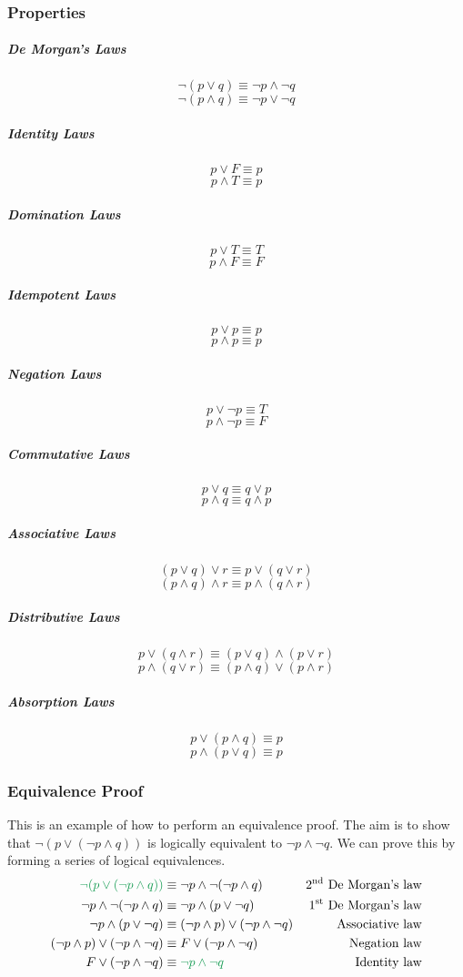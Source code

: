 \documentclass[a4paper, 10pt]{article}
\begin{document}
\subsubsection{Properties}
\begin{multicols}{2}
    \subparagraph{De Morgan's Laws}
    \[ \neg(p\lor q) \equiv \neg p \land \neg q \]
    \[ \neg(p\land q) \equiv \neg p \lor \neg q \]

    \subparagraph{Identity Laws}
    \[ p \lor F \equiv p \]
    \[ p \land T \equiv p \]

    \subparagraph{Domination Laws}
    \[ p \lor T \equiv T \]
    \[ p \land F \equiv F \]

    \subparagraph{Idempotent Laws}
    \[ p \lor p \equiv p\]
    \[p \land p \equiv p\]

    \subparagraph{Negation Laws}
    \[ p \lor \neg p \equiv T \]
    \[ p \land \neg p \equiv F \]

    \subparagraph{Commutative Laws}
    \[ p \lor q \equiv q \lor p \]
    \[ p \land q \equiv q \land p\]

    \subparagraph{Associative Laws}
    \[ (p \lor q)\lor r \equiv p\lor(q\lor r) \]
    \[ (p \land q)\land r \equiv p\land(q\land r) \]

    \subparagraph{Distributive Laws}
    \[ p\lor (q \land r) \equiv (p\lor q) \land (p\lor r) \]
    \[ p\land (q\lor r) \equiv (p\land q)\lor(p\land r) \]

    \subparagraph{Absorption Laws}
    \[ p \lor (p\land q) \equiv p \]
    \[ p \land (p\lor q) \equiv p \]
\end{multicols}

\subsubsection{Equivalence Proof}
This is an example of how to perform an equivalence proof. The aim is to show that \( \neg(p\lor (\neg p \land q)) \) is logically equivalent to \( \neg p\land \neg q \). We can prove this by forming a series of logical equivalences.
\begin{align*}
    \textcolor{ForestGreen}{\neg (p\lor(\neg p\land q))} &\equiv \neg p \land \neg(\neg p\land q) & \text{2\textsuperscript{nd} De Morgan's law}\\
    \neg p \land \neg(\neg p\land q) &\equiv \neg p \land (p\lor\neg q) & \text{1\textsuperscript{st} De Morgan's law} \\
    \neg p \land (p\lor\neg q) &\equiv (\neg p \land p)\lor(\neg p\land \neg q) & \text{Associative law} \\
    (\neg p \land p)\lor(\neg p\land \neg q) &\equiv F \lor (\neg p \land \neg q) & \text{Negation law} \\
    F \lor (\neg p \land \neg q) &\equiv \textcolor{ForestGreen}{\neg p \land \neg q} & \text{Identity law}
\end{align*}
\end{document}
